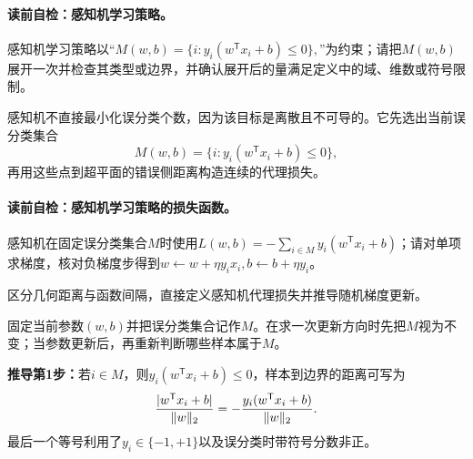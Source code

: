 \paragraph{读前自检：感知机学习策略。}感知机学习策略以“$M(w,b)=\{i:y_i(w^{\mathsf T}x_i+b)\le0\},$”为约束；请把$M(w,b)$展开一次并检查其类型或边界，并确认展开后的量满足定义中的域、维数或符号限制。\par

\label{struct:V2-C01-CH09}
感知机不直接最小化误分类个数，因为该目标是离散且不可导的。它先选出当前误分类集合
\[
M(w,b)=\{i:y_i(w^{\mathsf T}x_i+b)\le0\},
\]
再用这些点到超平面的错误侧距离构造连续的代理损失。

\paragraph{读前自检：感知机学习策略的损失函数。}感知机在固定误分类集合$M$时使用$L(w,b)=-\sum_{i\in M}y_i(w^{\mathsf T}x_i+b)$；请对单项求梯度，核对负梯度步得到$w\leftarrow w+\eta y_ix_i,b\leftarrow b+\eta y_i$。\par

\label{struct:V2-C01-CH11}

\begin{derivationgoalbox}
区分几何距离与函数间隔，直接定义感知机代理损失并推导随机梯度更新。
\end{derivationgoalbox}
\begin{derivationprepbox}
固定当前参数$(w,b)$并把误分类集合记作$M$。在求一次更新方向时先把$M$视为不变；当参数更新后，再重新判断哪些样本属于$M$。
\end{derivationprepbox}
\textbf{推导第1步：}若$i\in M$，则$y_i(w^{\mathsf T}x_i+b)\le0$，样本到边界的距离可写为
\[
\frac{\lvert w^{\mathsf T}x_i+b\rvert}{\lVert w\rVert_2}
=-\frac{y_i(w^{\mathsf T}x_i+b)}{\lVert w\rVert_2}.
\]
最后一个等号利用了$y_i\in\{-1,+1\}$以及误分类时带符号分数非正。

